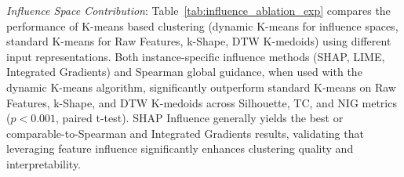 \documentclass[final,authoryear,3p,times,review,sort&compress]{elsarticle}
\begin{document}
\textit{Influence Space Contribution}: Table~\ref{tab:influence_ablation_exp} compares the performance of K-means based clustering (dynamic K-means for influence spaces, standard K-means for Raw Features, k-Shape, DTW K-medoids) using different input representations. Both instance-specific influence methods (SHAP, LIME, Integrated Gradients) and Spearman global guidance, when used with the dynamic K-means algorithm, significantly outperform standard K-means on Raw Features, k-Shape, and DTW K-medoids across Silhouette, TC, and NIG metrics ($p < 0.001$, paired t-test). SHAP Influence generally yields the best or comparable-to-Spearman and Integrated Gradients results, validating that leveraging feature influence significantly enhances clustering quality and interpretability.

\begin{table}[t!]
\centering
\caption{Influence Space Ablation Results (K-means based clustering, Optimal K, Mean $\pm$ 95\% CI). For influence spaces, dynamic K-means is used; for Raw Features, standard K-means. Best result for each metric is bolded.}
\label{tab:influence_ablation_exp} 
\end{table}
\end{document}
